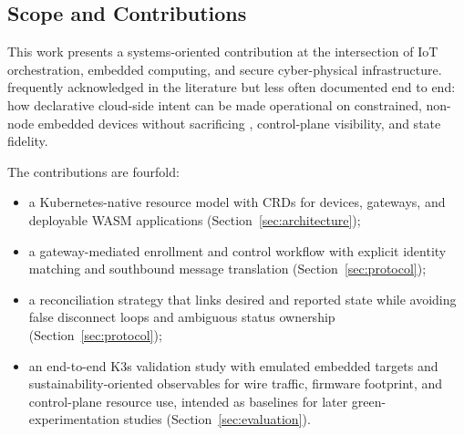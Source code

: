 \subsection{Scope and Contributions}
This work presents a systems-oriented contribution at the intersection of IoT orchestration, embedded computing, and secure cyber-physical infrastructure. %
 frequently acknowledged in the literature but less often documented end to end: how declarative cloud-side intent can be made operational on constrained, non-node embedded devices without sacrificing , control-plane visibility, and state fidelity.

The contributions are fourfold:
\begin{itemize}[leftmargin=*,nosep]
    \item a Kubernetes-native resource model with CRDs for devices, gateways, and deployable WASM applications (Section~\ref{sec:architecture});
    \item a gateway-mediated  enrollment and control workflow with explicit identity matching and southbound message translation (Section~\ref{sec:protocol});
    \item a reconciliation strategy that links desired and reported state while avoiding false disconnect loops and ambiguous status ownership (Section~\ref{sec:protocol});
    \item {\color{red}an end-to-end K3s validation study with emulated embedded targets and sustainability-oriented observables for wire traffic, firmware footprint, and control-plane resource use, intended as baselines for later green-experimentation studies (Section~\ref{sec:evaluation}).}
\end{itemize}

